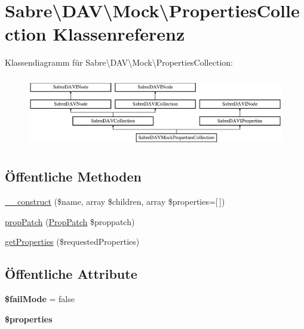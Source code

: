 \hypertarget{class_sabre_1_1_d_a_v_1_1_mock_1_1_properties_collection}{}\section{Sabre\textbackslash{}D\+AV\textbackslash{}Mock\textbackslash{}Properties\+Collection Klassenreferenz}
\label{class_sabre_1_1_d_a_v_1_1_mock_1_1_properties_collection}
Klassendiagramm für Sabre\textbackslash{}D\+AV\textbackslash{}Mock\textbackslash{}Properties\+Collection\+:\begin{figure}[H]
\begin{center}
\leavevmode
\includegraphics[height=3.137255cm]{class_sabre_1_1_d_a_v_1_1_mock_1_1_properties_collection}
\end{center}
\end{figure}
\subsection*{Öffentliche Methoden}
\begin{DoxyCompactItemize}
\item 
\mbox{\hyperlink{class_sabre_1_1_d_a_v_1_1_mock_1_1_properties_collection_adf3bde0490f82f56667e2915fe7e86d0}{\+\_\+\+\_\+construct}} (\$name, array \$children, array \$properties=\mbox{[}$\,$\mbox{]})
\item 
\mbox{\hyperlink{class_sabre_1_1_d_a_v_1_1_mock_1_1_properties_collection_a2226758ceb984e4c151a89973564e1f6}{prop\+Patch}} (\mbox{\hyperlink{class_sabre_1_1_d_a_v_1_1_prop_patch}{Prop\+Patch}} \$proppatch)
\item 
\mbox{\hyperlink{class_sabre_1_1_d_a_v_1_1_mock_1_1_properties_collection_a28e9b64c14a61b61a3ab8c7a4443d362}{get\+Properties}} (\$requested\+Properties)
\end{DoxyCompactItemize}
\subsection*{Öffentliche Attribute}
\begin{DoxyCompactItemize}
\item 
\mbox{\label{class_sabre_1_1_d_a_v_1_1_mock_1_1_properties_collection_a309564ca88ec4ac9cbfb14035c2fd504}} 
{\bfseries \$fail\+Mode} = false
\item 
\mbox{\label{class_sabre_1_1_d_a_v_1_1_mock_1_1_properties_collection_aef2ee5d0bfada60a689c2ba4e4b8c8b1}} 
{\bfseries \$properties}
\end{DoxyCompactItemize}


